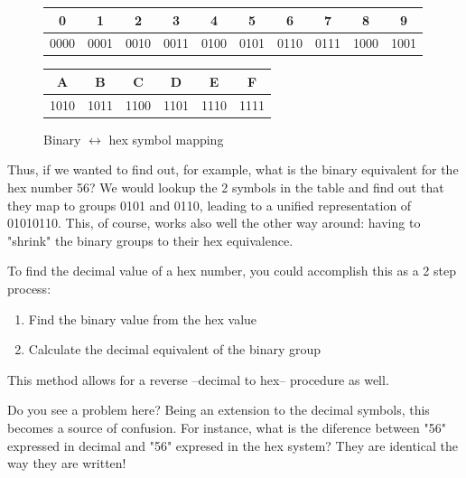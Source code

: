 \documentclass[12pt, a4paper]{book}
\begin{document}
\begin{figure}[h]
  \centering
  \renewcommand{\arraystretch}{1.5}
  \begin{tabular}{c | c | c | c | c | c | c | c | c | c}
    {\Large 0} & {\Large 1} & {\Large 2} & {\Large 3} & {\Large 4} & {\Large 5} & {\Large 6} & {\Large 7} & {\Large 8} & {\Large 9} \\ \hline
    {\large 0000} & {\large 0001} & {\large 0010} & {\large 0011} & {\large 0100} & {\large 0101} & {\large 0110} & {\large 0111} & {\large 1000} & {\large 1001} \\
  \end{tabular}
  \vspace{0.5cm}

  \begin{tabular}{ c | c | c | c | c | c }
     {\Large A} & {\Large B} & {\Large C} & {\Large D} & {\Large E} & {\Large F} \\ \hline
     {\large 1010} & {\large 1011} & {\large 1100} & {\large 1101} & {\large 1110} & {\large 1111}\\  
  \end{tabular}
  
  \renewcommand{\arraystretch}{1.0}
  \caption{Binary $\leftrightarrow$ hex symbol mapping}
  \label{fig:binary-hex complete mapping}
\end{figure}

Thus, if we wanted to find out, for example, what is the binary equivalent for the hex number 56? We would lookup the 2 symbols in the table and find out that they map to groups 0101 and 0110, leading to a unified representation of 01010110. This, of course, works also well the other way around: having to "shrink" the binary groups to their hex equivalence.

To find the decimal value of a hex number, you could accomplish this as a 2 step process:
\begin{enumerate}
  \item Find the binary value from the hex value
  \item Calculate the decimal equivalent of the binary group
\end{enumerate}
This method allows for a reverse --decimal to hex-- procedure as well.

Do you see a problem here? Being an extension to the decimal symbols, this becomes a source of confusion. For instance, what is the diference between "56" expressed in  decimal and "56" expresed in the hex system? They are identical the way they are written!
\end{document}
